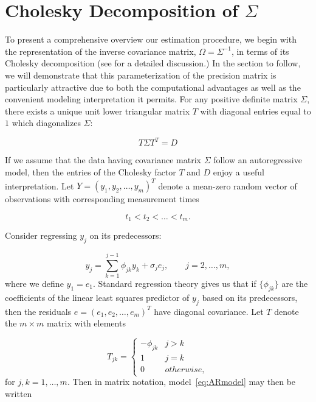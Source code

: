 \documentclass[12pt]{article}
\theoremstyle{definition}
\begin{document}
\section{Cholesky Decomposition of $\Sigma$}

To present a comprehensive overview our estimation procedure, we begin with the representation of the inverse covariance matrix, $\Omega = \Sigma^{-1}$, in terms of its Cholesky decomposition (see \citet{pourahmadi2007cholesky} for a detailed discussion.) In the section to follow, we will demonstrate that this parameterization of the precision matrix is particularly attractive due to both the computational advantages as well as the convenient modeling interpretation it permits. For any positive definite matrix $\Sigma$, there exists a unique unit lower triangular matrix $T$ with diagonal entries equal to $1$ which diagonalizes $\Sigma$:

\begin{equation}
\nonumber T \Sigma T^T = D
\end{equation}
\noindent

If we assume that the data having covariance matrix $\Sigma$ follow an autoregressive model, then the entries of the Cholesky factor $T$ and $D$ enjoy a useful interpretation. Let $Y = \left( y_{1}, y_{2}, \dots, y_{m} \right)^T$ denote a mean-zero random vector of observations with corresponding measurement times 

\[
t_{1} < t_{2} < \dots< t_{m}.
\]

Consider regressing $y_{j}$  on its predecessors:

\begin{equation}
{y}_{j}  = \sum_{k=1}^{j-1} \phi_{jk} y_{k} + \sigma_{j}e_{j}, \qquad j=2,\dots,m, \label{eq:ARmodel}
\end{equation}
\noindent where we define $y_{1}=e_{1}$. Standard regression theory gives us that if $\lbrace \phi_{jk} \rbrace$ are the coefficients of the linear least squares predictor of $y_{j}$ based on its predecessors, then the residuals $e =\left( e_{1}, e_{2},\dots, e_{m} \right)^T$ have diagonal covariance. Let $T$ denote the $m \times m$  matrix with elements 

\[
T_{jk} = \left\{
\begin{array}{ll}
-\phi_{jk} & j > k\\
1 & j = k \\
0 & otherwise,
\end{array}\right.
\]
\noindent
for $j,k=1,\dots,m$. Then in matrix notation,  model~\ref{eq:ARmodel} may then be written
\end{document}
